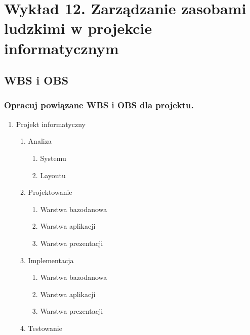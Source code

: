\chapter{Wykład 12. Zarządzanie zasobami ludzkimi w projekcie informatycznym}

\section{WBS i OBS}

\subsection*{Opracuj powiązane WBS i OBS dla projektu.}

\begin{enumerate}
\item Projekt informatyczny

\begin{enumerate}

\item Analiza

\begin{enumerate}

\item Systemu
\item Layoutu

\end{enumerate}
\item Projektowanie

\begin{enumerate}

\item Warstwa bazodanowa
\item Warstwa aplikacji
\item Warstwa prezentacji

\end{enumerate}
\item Implementacja

\begin{enumerate}

\item Warstwa bazodanowa
\item Warstwa aplikacji
\item Warstwa prezentacji

\end{enumerate}
\item Testowanie

\begin{enumerate}


\end{enumerate}
\end{enumerate}
\end{enumerate}
